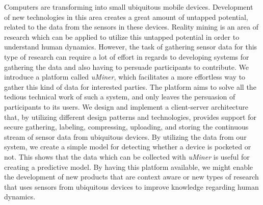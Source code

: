 
Computers are transforming into small ubiquitous mobile devices. Development of new technologies in this area creates a great amount of untapped potential, related to the data from the sensors in these devices. 
Reality mining is an area of research which can be applied to utilize this untapped potential in order to understand human dynamics. However, the task of gathering sensor data for this type of research can require a lot of effort in regards to developing systems for gathering the data and also having to persuade participants to contribute.
We introduce a platform called \emph{uMiner}, which facilitates a more effortless way to gather this kind of data for interested parties. The platform aims to solve all the tedious technical work of such a system, and only leaves the persuasion of participants to its users.
We design and implement a client-server architecture that, by utilizing different design patterns and technologies, provides support for secure gathering, labeling, compressing, uploading, and storing the continuous stream of sensor data from ubiquitous devices. 
By utilizing the data from our system, we create a simple model for detecting whether a device is pocketed or not. This shows that the data which can be collected with \emph{uMiner} is useful for creating a predictive model.  
By having this platform available, we might enable the development of new products that are context aware or new types of research that uses sensors from ubiquitous devices to improve knowledge regarding human dynamics.
